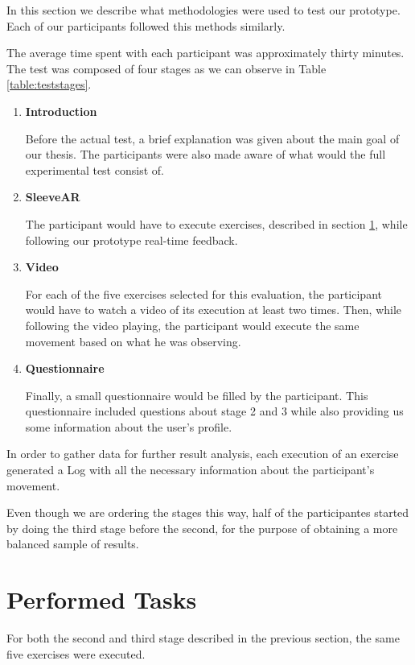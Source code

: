 In this section we describe what methodologies were used to test our prototype. Each of our participants followed this methods similarly.

The average time spent with each participant was approximately thirty minutes. The test was composed of four stages as we can observe in Table \ref{table:teststages}.

\begin{enumerate}
\item \textbf{Introduction}

Before the actual test, a brief explanation was given about the main goal of our thesis. The participants were also made aware of what would the full experimental test consist of.

\item \textbf{SleeveAR}

The participant would have to execute exercises, described in section \ref{evaluation-tasks}, while following our prototype real-time feedback.

\item \textbf{Video}

For each of the five exercises selected for this evaluation, the participant would have to watch a video of its execution at least two times. Then, while following the video playing, the participant would execute the same movement based on what he was observing.

\item \textbf{Questionnaire}

Finally, a small questionnaire would be filled by the participant. This questionnaire included questions about stage 2 and 3 while also providing us some information about the user's profile.

\end{enumerate}

In order to gather data for further result analysis, each execution of an exercise generated a Log with all the necessary information about the participant's movement. 

Even though we are ordering the stages this way, half of the participantes started by doing the third stage before the second, for the purpose of obtaining a more balanced sample of results.

\section{Performed Tasks} \label{evaluation-tasks}
For both the second and third stage described in the previous section, the same five exercises were executed.


